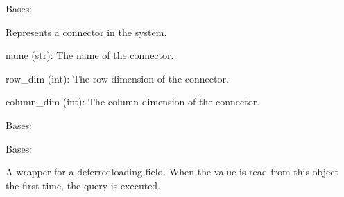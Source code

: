 \documentclass[letterpaper,10pt,english]{sphinxmanual}
\begin{document}
\begin{fulllineitems}
\label{\detokenize{app:app.models.connector}}
\pysigstartsignatures
{}
\pysigstopsignatures
\sphinxAtStartPar
Bases: 

\sphinxAtStartPar
Represents a connector in the system.
\begin{description}
\sphinxAtStartPar
name (str): The name of the connector.

\sphinxAtStartPar
row\_dim (int): The row dimension of the connector.

\sphinxAtStartPar
column\_dim (int): The column dimension of the connector.

\end{description}

\begin{fulllineitems}
\label{\detokenize{app:app.models.connector.DoesNotExist}}
\pysigstartsignatures
{}
\pysigstopsignatures
\sphinxAtStartPar
Bases: 

\end{fulllineitems}


\begin{fulllineitems}
\label{\detokenize{app:app.models.connector.MultipleObjectsReturned}}
\pysigstartsignatures
{}
\pysigstopsignatures
\sphinxAtStartPar
Bases: 

\end{fulllineitems}


\begin{fulllineitems}
\label{\detokenize{app:app.models.connector.column_dim}}
\pysigstartsignatures
{}
\pysigstopsignatures
\sphinxAtStartPar
A wrapper for a deferred\sphinxhyphen{}loading field. When the value is read from this
object the first time, the query is executed.


\end{fulllineitems}
\end{fulllineitems}
\end{document}
